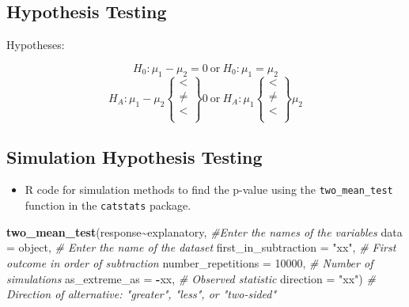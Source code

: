 \documentclass[
]{report}
\newenvironment{Shaded}{\begin{snugshade}}{\end{snugshade}}
\newcommand{\AttributeTok}[1]{\textcolor[rgb]{0.13,0.29,0.53}{#1}}
\newcommand{\CommentTok}[1]{\textcolor[rgb]{0.56,0.35,0.01}{\textit{#1}}}
\newcommand{\DecValTok}[1]{\textcolor[rgb]{0.00,0.00,0.81}{#1}}
\newcommand{\FunctionTok}[1]{\textcolor[rgb]{0.13,0.29,0.53}{\textbf{#1}}}
\newcommand{\NormalTok}[1]{#1}
\newcommand{\SpecialCharTok}[1]{\textcolor[rgb]{0.81,0.36,0.00}{\textbf{#1}}}
\newcommand{\StringTok}[1]{\textcolor[rgb]{0.31,0.60,0.02}{#1}}
\providecommand{\tightlist}{%
  \setlength{\itemsep}{0pt}\setlength{\parskip}{0pt}}
\begin{document}
\subsection*{Hypothesis Testing}\label{hypothesis-testing-7}

Hypotheses:

\[H_0: \mu_1 - \mu_2 = 0 ~ \text{or}~ H_0: \mu_1 = \mu_2 \]
\[H_A: \mu_1 - \mu_2 \left\{
\begin{array}{ll}
< \\
\ne \\
< \\
\end{array}
\right\}
0 
~ \text{or} ~ H_A:
\mu_1 \left\{
\begin{array}{ll}
< \\
\ne \\
< \\
\end{array}
\right\}
\mu_2 \]

\subsection*{Simulation Hypothesis Testing}\label{simulation-hypothesis-testing-1}

\begin{itemize}
\tightlist
\item
  R code for simulation methods to find the p-value using the \texttt{two\_mean\_test} function in the \texttt{catstats} package.
\end{itemize}

\begin{Shaded}
\begin{Highlighting}[]
\FunctionTok{two\_mean\_test}\NormalTok{(response}\SpecialCharTok{\textasciitilde{}}\NormalTok{explanatory, }\CommentTok{\#Enter the names of the variables }
               \AttributeTok{data =}\NormalTok{ object,  }\CommentTok{\# Enter the name of the dataset}
              \AttributeTok{first\_in\_subtraction =} \StringTok{"xx"}\NormalTok{, }\CommentTok{\# First outcome in order of subtraction }
               \AttributeTok{number\_repetitions =} \DecValTok{10000}\NormalTok{,  }\CommentTok{\# Number of simulations }
               \AttributeTok{as\_extreme\_as =} \SpecialCharTok{{-}}\NormalTok{xx,  }\CommentTok{\# Observed statistic }
               \AttributeTok{direction =} \StringTok{"xx"}\NormalTok{)  }\CommentTok{\# Direction of alternative: "greater", "less", or "two{-}sided"}
\end{Highlighting}
\end{Shaded}
\end{document}
